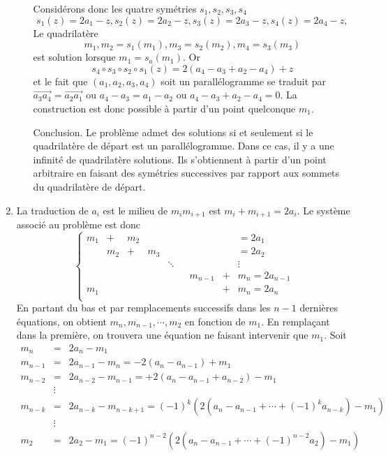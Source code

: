 \begin{enumerate}
\begin{enumerate}
Considérons donc les quatre symétries $s_{1},s_{2},s_{3},s_{4}$
\[s_{1}(z)=2a_{1}-z, s_{2}(z)=2a_{2}-z, s_{3}(z)=2a_{3}-z, s_{4}(z)=2a_{4}-z,\]
Le quadrilatère
\[m_{1},m_{2}=s_{1}(m_{1}),m_{3}=s_{2}(m_{2}),m_{4}=s_{3}(m_{3})\]
est solution lorsque $m_{1}=s_{a}(m_{1})$. Or
\[s_{4}\circ s_{3}\circ s_{2}\circ s_{1}(z)=2(a_{4}- a_{3}+ a_{2}- a_{4})+z \]
et le fait que $ (a_{1},a_{2}, a_{3},a_{4})$ soit un parallélogramme se traduit par $\overrightarrow{a_{3}a_{4}}=\overrightarrow{a_{2}a_{1}}$ ou $a_{4}-a_{3}=a_{1}-a_{2}$ ou $ a_{4}- a_{3}+ a_{2}- a_{4}=0$. La construction est donc possible à partir d'un point quelconque $m_{1}$.

Conclusion. Le problème admet des solutions si et seulement si le quadrilatère de départ est un parallélogramme. Dans ce cas, il y a une infinité de quadrilatère solutions. Ils s'obtiennent à partir d'un point arbitraire en faisant des symétries successives par rapport aux sommets du quadrilatère de départ.
\end{enumerate}
\item La traduction de $a_{i}$ est le milieu de $m_{i}m_{i+1}$ est $m_{i}+m_{i+1}=2a_{i}$.
Le système associé au problème est donc
\[
\left \{
\begin{array}{ccccccccc}
m_{1}&+&m_{2}&&&&&& =2a_{1}\\
&m_{2}&+&m_{3}&&&&& =2a_{2}\\
&&&&\ddots&&&& \vdots\\
&&&&&&m_{n-1}&+&m_{n} =2a_{n-1}\\
m_{1}&&&&&&&+&m_{n} =2a_{n}\\
\end{array}
\right.
\]
En partant du bas et par remplacements successifs dans les $n-1$ dernières équations, on obtient $m_{n},m_{n-1}, \cdots, m_{2}$ en fonction de $m_{1}$. En remplaçant dans la première, on trouvera une équation ne faisant intervenir que $m_{1}$. Soit
\begin{eqnarray*}
m_{n}&=&2a_{n}-m_{1}\\
m_{n-1}&=&2a_{n-1}-m_{n}=-2(a_{n}-a_{n-1})+m_{1}\\
m_{n-2}&=&2a_{n-2}-m_{n-1}=+2(a_{n}-a_{n-1}+a_{n-2})-m_{1}\\
&\vdots&\\
m_{n-k}&=&2a_{n-k}-m_{n-k+1}=(-1)^{k}\left(2(a_{n}-a_{n-1}+\cdots +(-1)^{k}a_{n-k})-m_{1}\right)\\
&\vdots&\\
m_{2}&=&2a_{2}-m_{1}=(-1)^{n-2}\left(2(a_{n}-a_{n-1}+\cdots +(-1)^{n-2}a_{2})-m_{1}\right)
\end{eqnarray*}

\end{enumerate}
